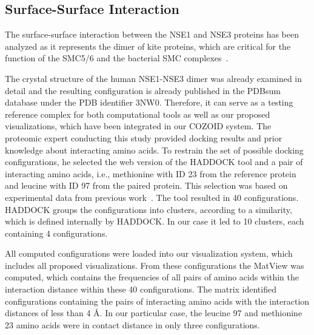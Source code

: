 \documentclass{bmcart}
\begin{document}
\subsection{Surface-Surface Interaction}
The surface-surface interaction between the NSE1 and NSE3 proteins has been analyzed as it represents the dimer of kite proteins, which are critical for the function of the SMC5/6 and the bacterial SMC complexes~\cite{Zabrady2016,Palecek2015,Doyle2010}. 

The crystal structure of the human NSE1-NSE3 dimer was already examined in detail and the resulting configuration is already published in the PDBsum database under the PDB identifier 3NW0. 
Therefore, it can serve as a testing reference complex for both computational tools as well as our proposed visualizations, which have been integrated in our COZOID system.
The proteomic expert conducting this study provided docking results and prior knowledge about interacting amino acids.
To restrain the set of possible docking configurations, he selected the web version of the HADDOCK tool and a pair of interacting amino acids, i.e., methionine with ID 23 from the reference protein and leucine with ID 97 from the paired protein.
This selection was based on experimental data from previous work~\cite{Hudson2011,Kozakova,Crabben}.
The tool resulted in 40 configurations.
HADDOCK groups the configurations into clusters, according to a similarity, which is defined internally by HADDOCK.
In our case it led to 10 clusters, each containing 4 configurations.

All computed configurations were loaded into our visualization system, which includes all proposed visualizations.
From these configurations the MatView was computed, which contains the frequencies of all pairs of amino acids within the interaction distance within these 40 configurations.
The matrix identified configurations containing the pairs of interacting amino acids with the interaction distances of less than 4 \AA.
In our particular case, the leucine 97 and methionine 23 amino acids were in contact distance in only three configurations.
\end{document}
